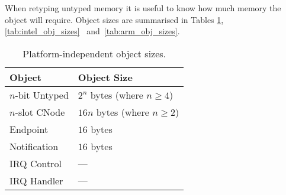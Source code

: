 {When retyping untyped memory it is useful to know how much memory the
object will require. Object sizes are summarised in Tables
\ref{tab:obj_sizes}\ifxeightsix, \ref{tab:intel_obj_sizes}\else\ \fi{} 
and~\ref{tab:arm_obj_sizes}.

\begin{table}[tbp]
        \begin{center}
            \begin{tabular}{ll}
                \toprule
                  Object                & Object Size \\
                \midrule
                  $n$-bit Untyped       & $2^n$ bytes (where $n \ge 4$) \\
                  $n$-slot CNode        & $16n$ bytes (where $n \ge 2$) \\
                  Endpoint              & $16$ bytes \\
                  Notification          & $16$ bytes \\
                  IRQ Control           & --- \\
                  IRQ Handler           & --- \\
                \bottomrule
            \end{tabular}
        \end{center}
    \caption{Platform-independent object sizes.}
    \label{tab:obj_sizes}
\end{table}

}
